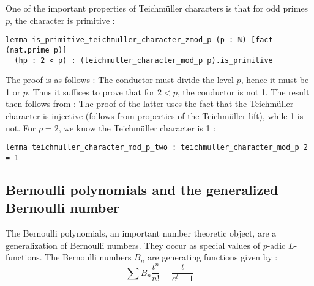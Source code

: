 \documentclass[a4paper,UKenglish,cleveref, autoref, thm-restate]{lipics-v2021}
\newcommand{\lean}[1]{\texttt{#1}\xspace} %
\begin{document}
One of the important properties of Teichmüller characters is that for odd primes $p$, the character is 
primitive : 
\begin{lstlisting}
lemma is_primitive_teichmuller_character_zmod_p (p : ℕ) [fact (nat.prime p)] 
  (hp : 2 < p) : (teichmuller_character_mod_p p).is_primitive
\end{lstlisting}
The proof is as follows : The conductor must divide the level $p$, hence it must be 1 or $p$. Thus it 
suffices to prove that for $2 < p$, the conductor is not 1. The result then follows from : 
The proof of the latter uses the fact that the Teichmüller character is injective (follows from 
properties of the Teichmüller lift), while 1 is not. For $p = 2$, we know the Teichmüller character is 1 : 
\begin{lstlisting}
lemma teichmuller_character_mod_p_two : teichmuller_character_mod_p 2 = 1
\end{lstlisting}


\subsection{Bernoulli polynomials and the generalized Bernoulli number}
The Bernoulli polynomials, an important number theoretic object, are a generalization of
Bernoulli numbers. They occur as special values
of $p$-adic $L$-functions. The Bernoulli numbers $B_n$ are generating functions given by :
$$\sum B_n\frac{t^n}{n!}=\frac{t}{e^{t} - 1}$$
\end{document}
